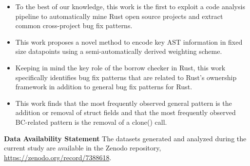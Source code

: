 \begin{itemize}
    \item To the best of our knowledge, this work is the first to exploit a code analysis pipeline to automatically mine Rust open source projects and extract common cross-project bug fix patterns.
    \item This work proposes a novel method to encode key AST information in fixed size datapoints using a semi-automatically derived weighting scheme.
    \item Keeping in mind the key role of the borrow checker in Rust, this work specifically identifies bug fix patterns that are related to Rust's ownership framework in addition to general bug fix patterns for Rust.
    \item This work finds that the most frequently observed general pattern is the addition or removal of struct fields and that the most frequently observed BC-related pattern is the removal of a clone() call. 
\end{itemize}

\noindent \textbf{Data Availability Statement} The datasets generated and analyzed during the current study are available in the Zenodo repository, \url{https://zenodo.org/record/7388618}.
